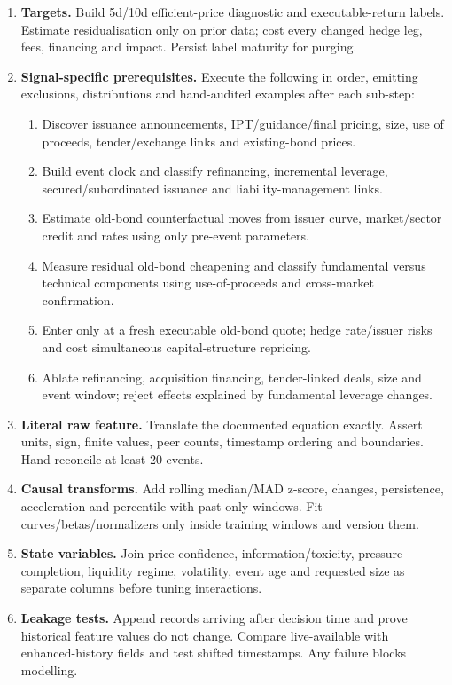 \documentclass[10pt]{article}
\begin{document}
\begin{enumerate}[leftmargin=2em,label=\textbf{A\arabic*.}]
\item \textbf{Targets.} Build 5d/10d efficient-price diagnostic and executable-return labels. Estimate residualisation only on prior data; cost every changed hedge leg, fees, financing and impact. Persist label maturity for purging.
\item \textbf{Signal-specific prerequisites.} Execute the following in order, emitting exclusions, distributions and hand-audited examples after each sub-step:
\begin{enumerate}[label=\alph*)]
\item Discover issuance announcements, IPT/guidance/final pricing, size, use of proceeds, tender/exchange links and existing-bond prices.
\item Build event clock and classify refinancing, incremental leverage, secured/subordinated issuance and liability-management links.
\item Estimate old-bond counterfactual moves from issuer curve, market/sector credit and rates using only pre-event parameters.
\item Measure residual old-bond cheapening and classify fundamental versus technical components using use-of-proceeds and cross-market confirmation.
\item Enter only at a fresh executable old-bond quote; hedge rate/issuer risks and cost simultaneous capital-structure repricing.
\item Ablate refinancing, acquisition financing, tender-linked deals, size and event window; reject effects explained by fundamental leverage changes.
\end{enumerate}
\item \textbf{Literal raw feature.} Translate the documented equation exactly. Assert units, sign, finite values, peer counts, timestamp ordering and boundaries. Hand-reconcile at least 20 events.
\item \textbf{Causal transforms.} Add rolling median/MAD z-score, changes, persistence, acceleration and percentile with past-only windows. Fit curves/betas/normalizers only inside training windows and version them.
\item \textbf{State variables.} Join price confidence, information/toxicity, pressure completion, liquidity regime, volatility, event age and requested size as separate columns before tuning interactions.
\item \textbf{Leakage tests.} Append records arriving after decision time and prove historical feature values do not change. Compare live-available with enhanced-history fields and test shifted timestamps. Any failure blocks modelling.

\end{enumerate}
\end{document}
